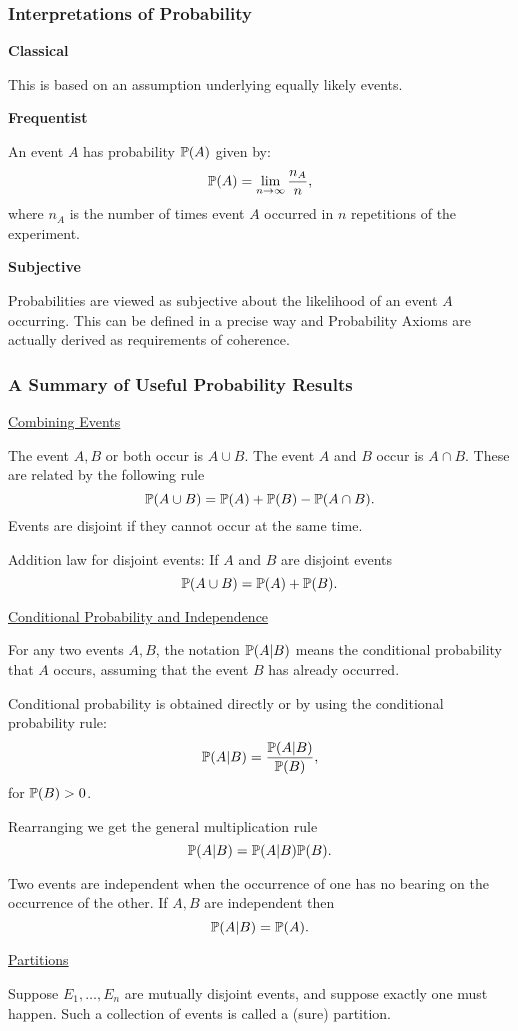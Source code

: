 \documentclass[10pt, a4paper]{article}
\begin{document}
\subsubsection{Interpretations of Probability}
\textbf{Classical}

This is based on an assumption underlying equally likely events.

\textbf{Frequentist}

An event $A$ has probability $\P(A)$ given by:
\[
\P(A) = \liminfty\frac{n_A}{n},
\]
where $n_A$ is the number of times event $A$ occurred in $n$ repetitions of the experiment.

\textbf{Subjective}

Probabilities are viewed as subjective about the likelihood of an event $A$ occurring.
This can be defined in a precise way and Probability Axioms are actually derived as requirements of coherence.

\subsubsection{A Summary of Useful Probability Results}
\underline{Combining Events}

The event $A, B$ or both occur is $A \cup B$.
The event $A$ and $B$ occur is $A \cap B$.
These are related by the following rule
\[
\P(A \cup B) = \P(A) + \P(B) - \P(A \cap B).
\]
Events are disjoint if they cannot occur at the same time.

Addition law for disjoint events:
If $A$ and $B$ are disjoint events
\[
\P(A \cup B) = \P(A) + \P(B).
\]

\underline{Conditional Probability and Independence}

For any two events $A, B$,
the notation $\P(A | B)$ means the conditional probability that $A$ occurs,
assuming that the event $B$ has already occurred.

Conditional probability is obtained directly or by using the conditional probability rule:
\[
\P(A | B) = \frac{\P(A | B)}{\P(B)},
\]
for $\P(B) > 0$.

Rearranging we get the general multiplication rule
\[
\P(A | B) = \P(A | B)\P(B).
\]

Two events are independent when the occurrence of one has no bearing on the occurrence of the other.
If $A, B$ are independent then
\[
\P(A | B) = \P(A).
\]

\underline{Partitions}

Suppose $E_1, \dotsc, E_n$ are mutually disjoint events,
and suppose exactly one must happen.
Such a collection of events is called a
(sure)
partition.
\end{document}

